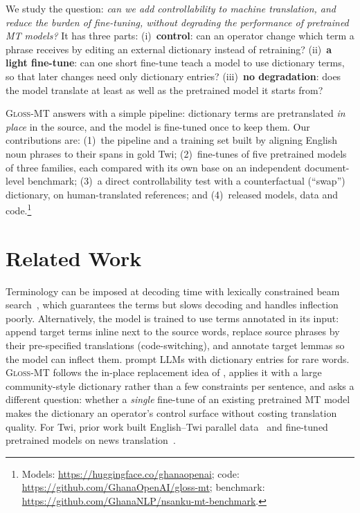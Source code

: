 \documentclass[10pt,twocolumn]{article}
\newcommand{\gm}{\textsc{Gloss-MT}}
\begin{document}
We study the question: \emph{can we add controllability to machine translation, and reduce the burden of fine-tuning, without degrading the performance of pretrained MT models?} It has three parts: (i)~\textbf{control}: can an operator change which term a phrase receives by editing an external dictionary instead of retraining? (ii)~\textbf{a light fine-tune}: can one short fine-tune teach a model to use dictionary terms, so that later changes need only dictionary entries? (iii)~\textbf{no degradation}: does the model translate at least as well as the pretrained model it starts from?

\gm{} answers with a simple pipeline: dictionary terms are pretranslated \emph{in place} in the source, and the model is fine-tuned once to keep them. Our contributions are: (1)~the pipeline and a training set built by aligning English noun phrases to their spans in gold Twi; (2)~fine-tunes of five pretrained models of three families, each compared with its own base on an independent document-level benchmark; (3)~a direct controllability test with a counterfactual (``swap'') dictionary, on human-translated references; and (4)~released models, data and code.\footnote{Models: \url{https://huggingface.co/ghanaopenai}; code: \url{https://github.com/GhanaOpenAI/gloss-mt}; benchmark: \url{https://github.com/GhanaNLP/nsanku-mt-benchmark}.}

\section{Related Work}

Terminology can be imposed at decoding time with lexically constrained beam search~\cite{hokamp2017lexically,post2018fast}, which guarantees the terms but slows decoding and handles inflection poorly. Alternatively, the model is trained to use terms annotated in its input: \citet{dinu2019training} append target terms inline next to the source words, \citet{song2019code} replace source phrases by their pre-specified translations (code-switching), and \citet{bergmanis2021facilitating} annotate target lemmas so the model can inflect them. \citet{ghazvininejad2023dictionary} prompt LLMs with dictionary entries for rare words. \gm{} follows the in-place replacement idea of \citet{song2019code}, applies it with a large community-style dictionary rather than a few constraints per sentence, and asks a different question: whether a \emph{single} fine-tune of an existing pretrained MT model makes the dictionary an operator's control surface without costing translation quality. For Twi, prior work built English--Twi parallel data~\cite{azunre2021english} and fine-tuned pretrained models on news translation~\cite{adelani2022few}.
\end{document}
